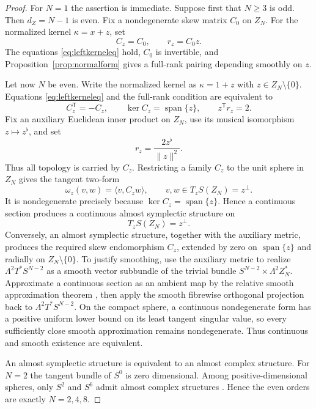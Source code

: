 \documentclass[11pt,a4paper]{article}
\theoremstyle{definition}
\theoremstyle{remark}
\newcommand{\Ker}{\operatorname{ker}}
\newcommand{\spanof}{\operatorname{span}}
\begin{document}
\begin{proof}
For $N=1$ the assertion is immediate.  Suppose first that $N\geq3$ is odd.  Then
$d_Z=N-1$ is even.  Fix a nondegenerate skew matrix $C_0$ on $Z_N$.  For the normalized
kernel $\kappa=x+z$, set
\begin{equation}\label{eq:oddglobalsection}
 C_z=C_0,\qquad r_z=C_0z.
\end{equation}
The equations \eqref{eq:leftkerneleq} hold, $C_0$ is invertible, and
Proposition~\ref{prop:normalform} gives a full-rank pairing depending smoothly on $z$.

Let now $N$ be even.  Write the normalized kernel as $\kappa=1+z$ with
$z\in Z_N\setminus\{0\}$.  Equations \eqref{eq:leftkerneleq} and the full-rank condition are
equivalent to
\begin{equation}\label{eq:evensectiondata}
 C_z^{\mathsf T}=-C_z,\qquad \Ker C_z=\spanof\{z\},
 \qquad z^{\mathsf T}r_z=2.
\end{equation}
Fix an auxiliary Euclidean inner product on $Z_N$, use its musical isomorphism
$z\mapsto z^\flat$, and set
\begin{equation}\label{eq:globalrz}
 r_z=\frac{2z^\flat}{\|z\|^2}.
\end{equation}
Thus all topology is carried by $C_z$.  Restricting a family $C_z$ to the unit sphere in
$Z_N$ gives the tangent two-form
\begin{equation}\label{eq:tangenttwoform}
 \omega_z(v,w)=\langle v,C_zw\rangle,
 \qquad v,w\in T_zS(Z_N)=z^\perp.
\end{equation}
It is nondegenerate precisely because $\Ker C_z=\spanof\{z\}$.  Hence a continuous section
produces a continuous almost symplectic structure on
\begin{equation}\label{eq:tangentsphere}
 T_zS(Z_N)=z^\perp.
\end{equation}
Conversely, an almost symplectic structure, together with the auxiliary metric, produces the
required skew endomorphism $C_z$, extended by zero on $\spanof\{z\}$ and radially on
$Z_N\setminus\{0\}$.  To justify smoothing, use the auxiliary metric to realize
$\Lambda^2T^*S^{N-2}$ as a smooth vector subbundle of the trivial bundle
$S^{N-2}\times\Lambda^2Z_N^*$.  Approximate a continuous section as an ambient map by the
relative smooth approximation theorem \cite[Theorem~2.2.5]{hirsch1976}, then apply the
smooth fibrewise orthogonal projection back to $\Lambda^2T^*S^{N-2}$.  On the compact
sphere, a continuous nondegenerate form has a positive uniform lower bound on its least
tangent singular value, so every sufficiently close smooth approximation remains
nondegenerate.  Thus continuous and smooth existence are equivalent.

An almost symplectic structure is equivalent to an almost complex structure.  For $N=2$
the tangent bundle of $S^0$ is zero dimensional.  Among positive-dimensional spheres, only
$S^2$ and $S^6$ admit almost complex structures
\cite{borelserre1953,konstantisparton2017}.  Hence the even orders are exactly $N=2,4,8$.
\end{proof}
\end{document}
